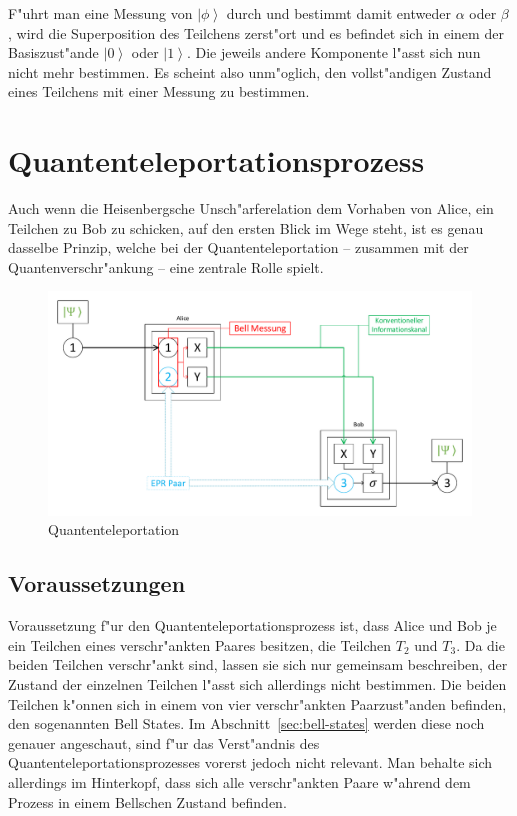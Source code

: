 \begin{refsection}
F"uhrt man eine Messung von $\left|\phi\right\rangle$ durch und bestimmt damit entweder $\alpha$ oder $\beta$, wird die Superposition des Teilchens zerst"ort und es befindet sich in einem der Basiszust"ande $\left|0\right\rangle$ oder $\left|1\right\rangle$. Die jeweils andere Komponente l"asst sich nun nicht mehr bestimmen. Es scheint also unm"oglich, den vollst"andigen Zustand eines Teilchens mit einer Messung zu bestimmen.

\section{Quantenteleportationsprozess}
%
Auch wenn die Heisenbergsche Unsch"arferelation dem Vorhaben von Alice, ein Teilchen zu Bob zu schicken, auf den ersten Blick im Wege steht, ist es genau dasselbe Prinzip, welche bei der Quantenteleportation -- zusammen mit der Quantenverschr"ankung -- eine zentrale Rolle spielt.
\begin{figure}
	\center
	\includegraphics[width=1\textwidth]{teleport/image/quantum_com.pdf}
	\caption{Quantenteleportation}
	\label{Quantenteleportation}
\end{figure}

\subsection{Voraussetzungen}

Voraussetzung f"ur den Quantenteleportationsprozess ist, dass Alice und Bob je ein Teilchen eines verschr"ankten Paares besitzen, die Teilchen $T_{2}$ und $T_{3}$. Da die beiden Teilchen  verschr"ankt sind, lassen sie sich nur gemeinsam beschreiben, der Zustand der einzelnen Teilchen l"asst sich allerdings nicht bestimmen. Die beiden Teilchen k"onnen sich in einem von vier verschr"ankten Paarzust"anden befinden, den sogenannten Bell States. Im Abschnitt~\ref{sec:bell-states} werden diese noch genauer angeschaut, sind f"ur das Verst"andnis des Quantenteleportationsprozesses vorerst jedoch nicht relevant. Man behalte sich allerdings im Hinterkopf, dass sich alle verschr"ankten Paare w"ahrend dem Prozess in einem Bellschen Zustand befinden.


\end{refsection}
